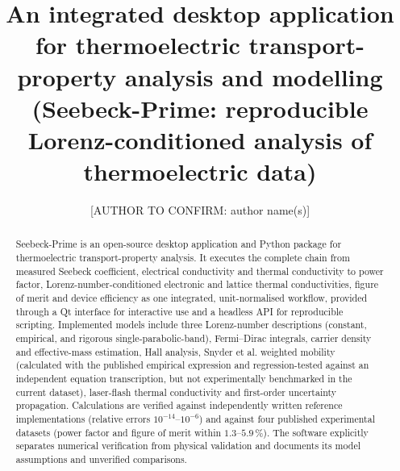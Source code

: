 \documentclass[preprint,12pt, a4paper]{elsarticle}
\begin{document}
\renewcommand{\labelenumii}{\arabic{enumi}.\arabic{enumii}}

\begin{frontmatter}


\title{An integrated desktop application for thermoelectric
transport-property analysis and modelling (Seebeck-Prime:
reproducible Lorenz-conditioned analysis of thermoelectric data)}


\author{[AUTHOR TO CONFIRM: author name(s)]}
\address{[AUTHOR TO CONFIRM: affiliation(s) and address(es)]}


\begin{abstract}
Seebeck-Prime is an open-source desktop application and Python package for
thermoelectric transport-property analysis. It executes the complete chain from
measured Seebeck coefficient, electrical conductivity and thermal conductivity
to power factor, Lorenz-number-conditioned electronic and lattice thermal
conductivities, figure of merit and device efficiency as one integrated,
unit-normalised workflow, provided through a Qt interface for interactive use
and a headless API for reproducible scripting. Implemented models include three
Lorenz-number descriptions (constant, empirical, and rigorous
single-parabolic-band), Fermi--Dirac integrals, carrier density and
effective-mass estimation, Hall analysis, Snyder et al. weighted mobility
(calculated with the published empirical expression and regression-tested
against an independent equation transcription, but not experimentally
benchmarked in the current dataset), laser-flash thermal conductivity and
first-order uncertainty propagation. Calculations are
verified against independently written reference implementations (relative
errors $10^{-14}$--$10^{-6}$) and against four published experimental datasets
(power factor and figure of merit within $1.3$--$5.9\,\%$). The software
explicitly separates numerical verification from physical validation and
documents its model assumptions and unverified comparisons.
\end{abstract}


\end{frontmatter}
\end{document}
